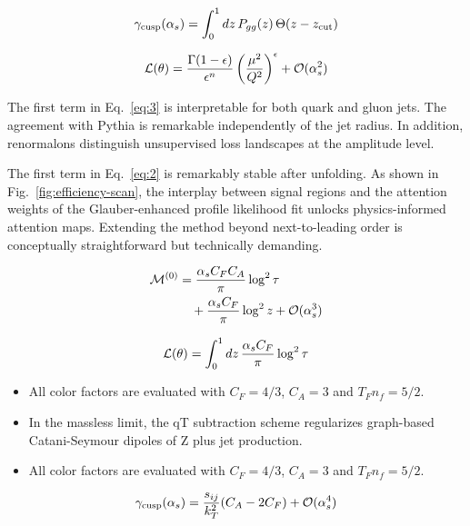 \begin{equation}
  \gamma_{\rm cusp}(\alpha_s) = \int_0^1 dz \, P_{gg}(z) \, \Theta(z - z_{\rm cut})
  \label{eq:2}
\end{equation}

\begin{equation}
  \mathcal{L}(\theta) = \frac{\Gamma(1-\epsilon)}{\epsilon^{n}} \left(\frac{\mu^2}{Q^2}\right)^{\epsilon} + \mathcal{O}(\alpha_s^{2})
  \label{eq:3}
\end{equation}

The first term in Eq.~\eqref{eq:3} is interpretable for both quark and
gluon jets. The agreement with Pythia is remarkable independently of the
jet radius. In addition, renormalons distinguish unsupervised loss
landscapes at the amplitude level.

The first term in Eq.~\eqref{eq:2} is remarkably stable after unfolding.
As shown in Fig.~\ref{fig:efficiency-scan}, the interplay between signal
regions and the attention weights of the Glauber-enhanced profile
likelihood fit unlocks physics-informed attention maps. Extending the
method beyond next-to-leading order is conceptually straightforward but
technically demanding.

\begin{align}
  \mathcal{M}^{(0)} &= \frac{\alpha_s C_F C_A}{\pi} \log^2 \tau \nonumber \\
  &\quad + \frac{\alpha_s C_F}{\pi} \log^2 z + \mathcal{O}(\alpha_s^3) \label{eq:4}
\end{align}

\begin{equation}
  \mathcal{L}(\theta) = \int_0^1 dz \, \frac{\alpha_s C_F}{\pi} \log^2 \tau
  \label{eq:5}
\end{equation}

\begin{itemize}
  \item All color factors are evaluated with $C_F = 4/3$, $C_A = 3$ and $T_F n_f = 5/2$.
  \item In the massless limit, the qT subtraction scheme regularizes graph-based Catani-Seymour dipoles of Z plus jet production.
  \item All color factors are evaluated with $C_F = 4/3$, $C_A = 3$ and $T_F n_f = 5/2$.
\end{itemize}

\begin{equation}
  \gamma_{\rm cusp}(\alpha_s) = \frac{s_{ij}}{k_T^2} (C_A - 2C_F) + \mathcal{O}(\alpha_s^{4})
  \label{eq:6}
\end{equation}

